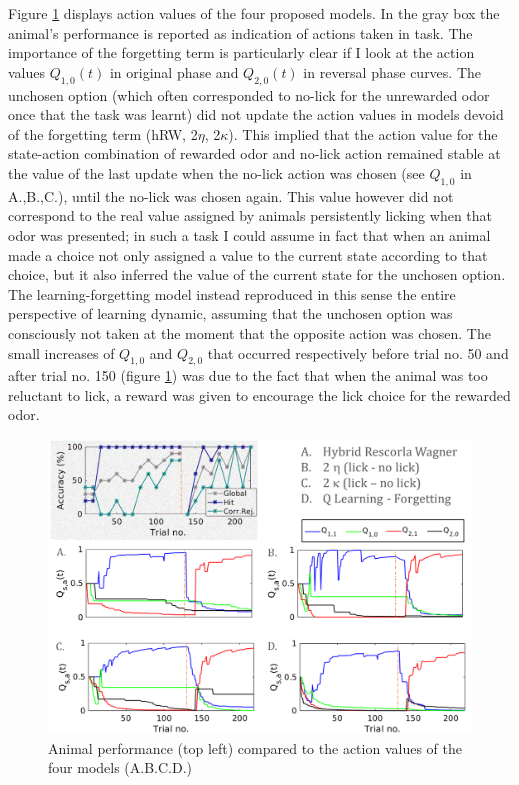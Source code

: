 Figure \ref{fig:4models} displays action values of the four proposed models. In the gray box the animal's performance is reported as indication of actions taken in task. The importance of the forgetting term is particularly clear if I look at the action values $Q_{1,0}(t)$ in original phase and $Q_{2,0}(t)$ in reversal phase curves. The unchosen option (which often corresponded to no-lick for the unrewarded odor once that the task was learnt) did not update the action values in models devoid of the forgetting term (hRW, 2$\eta$, 2$\kappa$). This implied that the action value for the state-action combination of rewarded odor and no-lick action remained stable at the value of the last update when the no-lick action was chosen (see $Q_{1,0}$ in A.,B.,C.), until the no-lick was chosen again. This value however did not correspond to the real value assigned by animals persistently licking when that odor was presented; in such a task I could assume in fact that when an animal made a choice not only assigned a value to the current state according to that choice, but it also inferred the value of the current state for the unchosen option. The learning-forgetting model instead reproduced in this sense the entire perspective of learning dynamic, assuming that the unchosen option was consciously not taken at the moment that the opposite action was chosen. The small increases of $Q_{1,0}$ and $Q_{2,0}$ that occurred respectively before trial no. 50 and after trial no. 150 (figure \ref{fig:4models}) was due to the fact that when the animal was too reluctant to lick, a reward was given to encourage the lick choice for the rewarded odor. 
\begin{figure}
    \centering
    \includegraphics[scale=0.66]{figures/Resume4models3.png}
    \caption{Animal performance (top left) compared to the action values of the four models (A.B.C.D.)}
    \label{fig:4models}
\end{figure}
